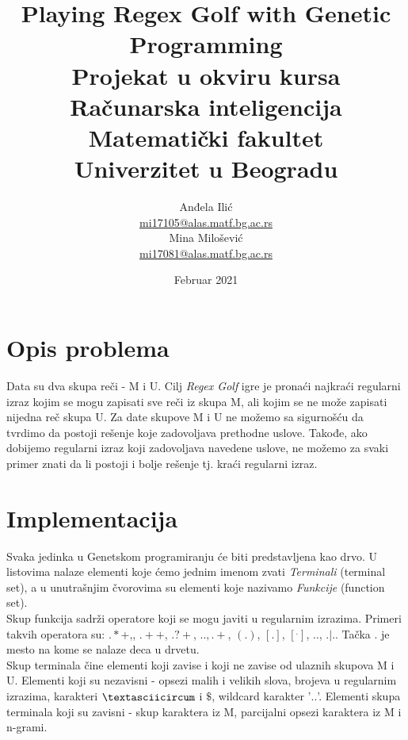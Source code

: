 \documentclass{article}
\title{%
  Playing Regex Golf with Genetic Programming \vspace{0.4cm} \\ 
  \large Projekat u okviru kursa Računarska inteligencija \\
  Matematički fakultet\\ Univerzitet u Beogradu \vspace*{0.5cm}}
\author{Anđela Ilić \\
\href{mailto:mi17105@alas.matf.bg.ac.rs}{mi17105@alas.matf.bg.ac.rs} \\
Mina Milošević \\
\href{mailto:mi17081@alas.matf.bg.ac.rs}{mi17081@alas.matf.bg.ac.rs} \\
}
\date{\vspace*{1cm}Februar 2021}
\begin{document}
\maketitle

\newpage

\renewcommand*\contentsname{Sadržaj}
\tableofcontents
\newpage

\section{Opis problema}
Data su dva skupa reči - M i U. Cilj \textit{Regex Golf} igre je pronaći najkraći regularni izraz kojim se mogu zapisati sve reči iz skupa M, ali kojim se ne može zapisati nijedna reč skupa U. Za date skupove M i U ne možemo sa sigurnošću da tvrdimo da postoji rešenje koje zadovoljava prethodne uslove. Takođe, ako dobijemo regularni izraz koji zadovoljava navedene uslove, ne možemo za svaki primer znati da li postoji i bolje rešenje tj. kraći regularni izraz. 

\section{Implementacija}
Svaka jedinka u Genetskom programiranju će biti predstavljena kao drvo.
U listovima nalaze elementi koje ćemo jednim imenom zvati \textit{Terminali} (terminal set), a u unutrašnjim čvorovima su elementi koje nazivamo \textit{Funkcije} (function set). \\
Skup funkcija sadrži operatore koji se mogu javiti u regularnim izrazima. Primeri takvih operatora su: $.*+$,, $.++$, $.?+$, $.{.,.}+$, $(.)$, $[.]$,
$[^.]$, $..$, $.|.$. Tačka $.$ je mesto na kome se nalaze deca u drvetu. \\
Skup terminala čine elementi koji zavise i koji ne zavise od ulaznih skupova M i U. Elementi koji su nezavisni - opsezi malih i velikih slova, brojeva u
regularnim izrazima, karakteri $\textasciicircum$ i $\$$, wildcard karakter '$..$'. Elementi skupa terminala koji su zavisni - skup karaktera iz M, parcijalni opsezi karaktera iz M i n-grami.
\end{document}
